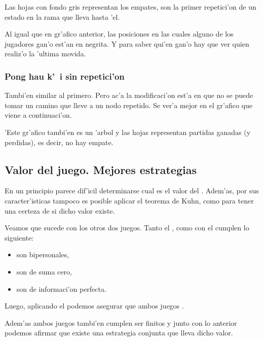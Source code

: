 Las hojas con fondo gris representan los empates, son la primer repetici'on de un estado en la rama que lleva hasta 'el.

Al igual que en gr'afico anterior, las posiciones en las cuales alguno de los jugadores gan'o est'an en negrita. Y para saber qui'en gan'o hay que ver quien realiz'o la 'ultima movida.

\clearpage

\subsubsection{Pong hau k'\ i sin repetici'on}

Tambi'en similar al primero. Pero ac'a la modificaci'on est'a en que no se puede tomar un camino que lleve a un nodo repetido. Se ver'a mejor en el gr'afico que viene a continuaci'on.

'Este gr'afico tambi'en es un 'arbol y las hojas representan partidas ganadas (y perdidas), es decir, no hay empate.

\clearpage


\subsection{Valor del juego. Mejores estrategias}
En un principio parece dif'icil determinarse cual es el valor del . Adem'as, por sus caracter'isticas tampoco es posible aplicar el teorema de Kuhn, como para tener una certeza de si dicho valor existe.

Veamos que sucede con los otros dos juegos. Tanto el , como con el  cumplen lo siguiente:

\begin{itemize}
\item son bipersonales,
\item son de suma cero,
\item son de informaci'on perfecta.
\end{itemize}

Luego, aplicando el  podemos asegurar que ambos juegos .

Adem'as ambos juegos tambi'en cumplen ser finitos y junto con lo anterior podemos afirmar que existe una estrategia conjunta que lleva dicho valor.

